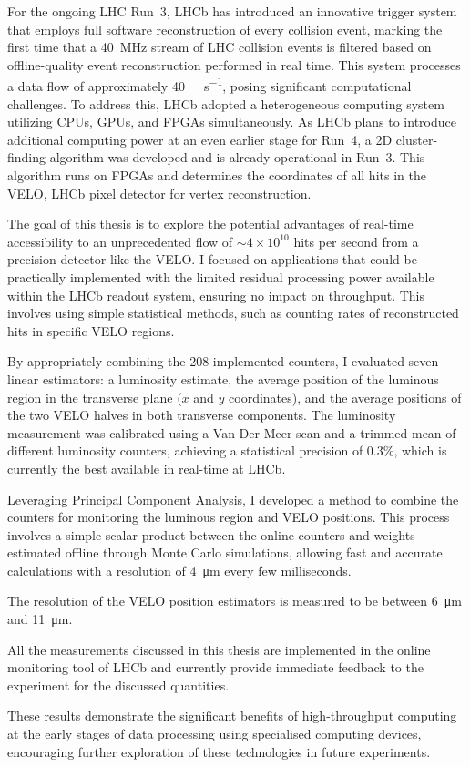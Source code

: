 For the ongoing LHC Run~3, LHCb has introduced an innovative trigger system that employs full software reconstruction of every collision event, marking the first time that a \SI{40}{\mega\hertz} stream of LHC collision events is filtered based on offline-quality event reconstruction performed in real time. This system processes a data flow of approximately \SI{40}{\tera\bit\per\second}, posing significant computational challenges. To address this, LHCb adopted a heterogeneous computing system utilizing CPUs, GPUs, and FPGAs simultaneously. As LHCb plans to introduce additional computing power at an even earlier stage for Run~4, a 2D cluster-finding algorithm was developed and is already operational in Run~3. This algorithm runs on FPGAs and determines the coordinates of all hits in the VELO, LHCb pixel detector for vertex reconstruction.

The goal of this thesis is to explore the potential advantages of real-time accessibility to an unprecedented flow of $\sim4 \times 10^{10}$ hits per second from a precision detector like the VELO. I focused on applications that could be practically implemented with the limited residual processing power available within the LHCb readout system, ensuring no impact on throughput. This involves using simple statistical methods, such as counting rates of reconstructed hits in specific VELO regions.

By appropriately combining the 208 implemented counters, I evaluated seven linear estimators: a luminosity estimate, the average position of the luminous region in the transverse plane ($x$ and $y$ coordinates), and the average positions of the two VELO halves in both transverse components. The luminosity measurement was calibrated using a Van Der Meer scan and a trimmed mean of different luminosity counters, achieving a statistical precision of $0.3\%$, which is currently the best available in real-time at LHCb.

Leveraging Principal Component Analysis, I developed a method to combine the counters for monitoring the luminous region and VELO positions. This process involves a simple scalar product between the online counters and weights estimated offline through Monte Carlo simulations, allowing fast and accurate calculations with a resolution of \SI{4}{\micro\meter} every few milliseconds. 

The resolution of the VELO position estimators is measured to be between \SI{6}{\micro\meter} and \SI{11}{\micro\meter}. 

All the measurements discussed in this thesis are implemented in the online monitoring tool of LHCb and currently provide immediate feedback to the experiment for the discussed quantities.

These results demonstrate the significant benefits of high-throughput computing at the early stages of data processing using specialised computing devices, encouraging further exploration of these technologies in future experiments.